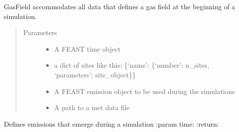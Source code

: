 \documentclass[letterpaper,10pt,english]{sphinxmanual}
\begin{document}
\begin{fulllineitems}
\label{\detokenize{index:feast.EmissionSimModules.infrastructure_classes.GasField}}
GasField accommodates all data that defines a gas field at the beginning of a simulation.
\begin{quote}\begin{description}
\item[{Parameters}] \leavevmode\begin{itemize}
\item {} 
 \textendash{} A FEAST time object

\item {} 
 \textendash{} a dict of sites like this: \{‘name’: \{‘number’: n\_sites, ‘parameters’: site\_object\}\}

\item {} 
 \textendash{} A FEAST emission object to be used during the simulations

\item {} 
 \textendash{} A path to a met data file

\end{itemize}

\end{description}\end{quote}

\begin{fulllineitems}
\label{\detokenize{index:feast.EmissionSimModules.infrastructure_classes.GasField.emerging_emissions}}
Defines emissions that emerge during a simulation
:param time:
:return:

\end{fulllineitems}



\end{fulllineitems}
\end{document}
